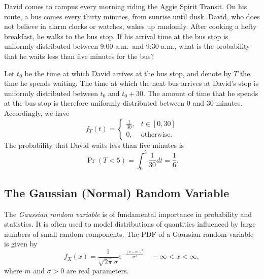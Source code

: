 \begin{example}
David comes to campus every morning riding the Aggie Spirit Transit.
On his route, a bus comes every thirty minutes, from sunrise until dusk.
David, who does not believe in alarm clocks or watches, wakes up randomly.
After cooking a hefty breakfast, he walks to the bus stop.
If his arrival time at the bus stop is uniformly distributed between 9:00 a.m.\ and 9:30 a.m., what is the probability that he waits less than five minutes for the bus?

Let $t_0$ be the time at which David arrives at the bus stop, and denote by $T$ the time he spends waiting.
The time at which the next bus arrives at David's stop is uniformly distributed between $t_0$ and $t_0 + 30$.
The amount of time that he spends at the bus stop is therefore uniformly distributed between $0$ and $30$ minutes.
Accordingly, we have
\begin{equation*}
f_T(t) = \begin{cases} \frac{1}{30}, & t \in [0, 30] \\
0, & \text{otherwise}. \end{cases}
\end{equation*}
The probability that David waits less than five minutes is
\begin{equation*}
\Pr (T < 5) = \int_0^5 \frac{1}{30} dt = \frac{1}{6} .
\end{equation*}
\end{example}


\subsection{The Gaussian (Normal) Random Variable}

The \emph{Gaussian random variable} is of fundamental importance in probability and statistics. 
It is often used to model distributions of quantities influenced by large numbers of small random components.
The PDF of a Gaussian random variable is given by
\begin{equation*}
f_X (x) = \frac{1}{\sqrt{2 \pi} \sigma} e^{- \frac{(x - m)^2}{2 \sigma^2}}
\quad - \infty < x < \infty,
\end{equation*}
where $m$ and $\sigma > 0$ are real parameters.

